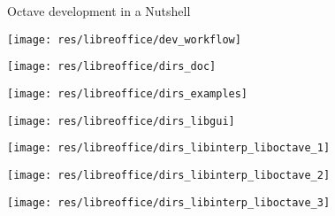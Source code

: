\begin{frame}{Octave development in a Nutshell}
\begin{center}
\texttt{[image: res/libreoffice/dev\_workflow]}
\end{center}
\end{frame}


\begin{frame}
\begin{center}
\texttt{[image: res/libreoffice/dirs\_doc]}
\end{center}
\end{frame}



\begin{frame}
\begin{center}
\texttt{[image: res/libreoffice/dirs\_examples]}
\end{center}
\end{frame}


\begin{frame}
\begin{center}
\texttt{[image: res/libreoffice/dirs\_libgui]}
\end{center}
\end{frame}


\begin{frame}
\begin{center}
\texttt{[image: res/libreoffice/dirs\_libinterp\_liboctave\_1]}
\end{center}
\end{frame}


\begin{frame}
\begin{center}
\texttt{[image: res/libreoffice/dirs\_libinterp\_liboctave\_2]}
\end{center}
\end{frame}


\begin{frame}
\begin{center}
\texttt{[image: res/libreoffice/dirs\_libinterp\_liboctave\_3]}
\end{center}
\end{frame}



